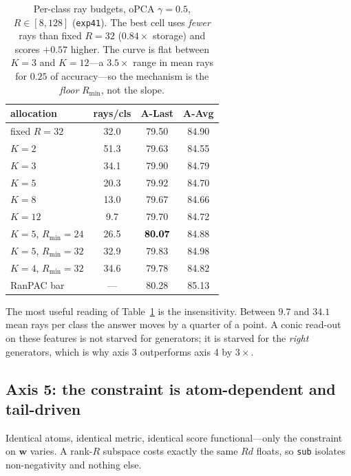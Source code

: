 \documentclass[10pt,twocolumn]{article}
\newcommand{\bw}{\mathbf{w}}
\newcommand{\good}[1]{\textcolor{black}{\textbf{#1}}}
\begin{document}
\begin{table}[t]\centering\small
\begin{tabular}{lccc}
\toprule
allocation & rays/cls & A-Last & A-Avg \\
\midrule
fixed $R{=}32$              & 32.0 & 79.50 & 84.90 \\
$K{=}2$                     & 51.3 & 79.63 & 84.55 \\
$K{=}3$                     & 34.1 & 79.90 & 84.79 \\
$K{=}5$                     & 20.3 & 79.92 & 84.70 \\
$K{=}8$                     & 13.0 & 79.67 & 84.66 \\
$K{=}12$                    & \phantom{0}9.7 & 79.70 & 84.72 \\
$K{=}5$, $R_{\min}{=}24$    & 26.5 & \good{80.07} & 84.88 \\
$K{=}5$, $R_{\min}{=}32$    & 32.9 & 79.83 & 84.98 \\
$K{=}4$, $R_{\min}{=}32$    & 34.6 & 79.78 & 84.82 \\
\midrule
RanPAC bar                  & ---  & 80.28 & 85.13 \\
\bottomrule
\end{tabular}
\caption{Per-class ray budgets, oPCA $\gamma{=}0.5$, $R\in[8,128]$
(\texttt{exp41}). The best cell uses \emph{fewer} rays than fixed $R{=}32$
($0.84\times$ storage) and scores $+0.57$ higher. The curve is flat between
$K{=}3$ and $K{=}12$---a $3.5\times$ range in mean rays for $0.25$ of
accuracy---so the mechanism is the \emph{floor} $R_{\min}$, not the slope.}
\label{tab:alloc}
\end{table}

The most useful reading of Table~\ref{tab:alloc} is the insensitivity. Between
$9.7$ and $34.1$ mean rays per class the answer moves by a quarter of a point.
A conic read-out on these features is not starved for generators; it is starved
for the \emph{right} generators, which is why axis 3 outperforms axis 4 by
$3\times$.

\subsection{Axis 5: the constraint is atom-dependent and tail-driven}
\label{sec:constraint}

Identical atoms, identical metric, identical score functional---only the
constraint on $\bw$ varies. A rank-$R$ subspace costs exactly the same $Rd$
floats, so \texttt{sub} isolates non-negativity and nothing else.
\end{document}
